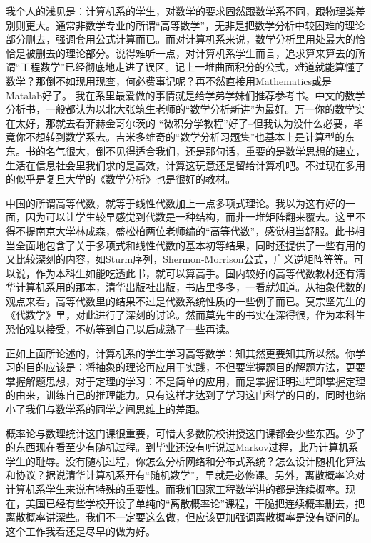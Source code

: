 我个人的浅见是：计算机系的学生，对数学的要求固然跟数学系不同，跟物理类差别则更大。通常非数学专业的所谓“高等数学”，无非是把数学分析中较困难的理论部分删去，强调套用公式计算而已。而对计算机系来说，数学分析里用处最大的恰恰是被删去的理论部分。说得难听一点，对计算机系学生而言，追求算来算去的所谓“工程数学”已经彻底地走进了误区。记上一堆曲面积分的公式，难道就能算懂了数学？那倒不如现用现查，何必费事记呢？再不然直接用Mathematics或是Matalab好了。
我在系里最爱做的事情就是给学弟学妹们推荐参考书。中文的数学分析书，一般都认为以北大张筑生老师的“数学分析新讲”为最好。万一你的数学实在太好，那就去看菲赫金哥尔茨的 “微积分学教程”好了--但我认为没什么必要，毕竟你不想转到数学系去。吉米多维奇的“数学分析习题集”也基本上是计算型的东东。书的名气很大，倒不见得适合我们，还是那句话，重要的是数学思想的建立，生活在信息社会里我们求的是高效，计算这玩意还是留给计算机吧。不过现在多用的似乎是复旦大学的《数学分析》也是很好的教材。

中国的所谓高等代数，就等于线性代数加上一点多项式理论。我以为这有好的一面，因为可以让学生较早感觉到代数是一种结构，而非一堆矩阵翻来覆去。这里不得不提南京大学林成森，盛松柏两位老师编的“高等代数”，感觉相当舒服。此书相当全面地包含了关于多项式和线性代数的基本初等结果，同时还提供了一些有用的又比较深刻的内容，如Sturm序列，Shermon-Morrison公式，广义逆矩阵等等。可以说，作为本科生如能吃透此书，就可以算高手。国内较好的高等代数教材还有清华计算机系用的那本，清华出版社出版，书店里多多，一看就知道。从抽象代数的观点来看，高等代数里的结果不过是代数系统性质的一些例子而已。莫宗坚先生的《代数学》里，对此进行了深刻的讨论。然而莫先生的书实在深得很，作为本科生恐怕难以接受，不妨等到自己以后成熟了一些再读。

正如上面所论述的，计算机系的学生学习高等数学：知其然更要知其所以然。你学习的目的应该是：将抽象的理论再应用于实践，不但要掌握题目的解题方法，更要掌握解题思想，对于定理的学习：不是简单的应用，而是掌握证明过程即掌握定理的由来，训练自己的推理能力。只有这样才达到了学习这门科学的目的，同时也缩小了我们与数学系的同学之间思维上的差距。

概率论与数理统计这门课很重要，可惜大多数院校讲授这门课都会少些东西。少了的东西现在看至少有随机过程。到毕业还没有听说过Markov过程，此乃计算机系学生的耻辱。没有随机过程，你怎么分析网络和分布式系统？怎么设计随机化算法和协议？据说清华计算机系开有“随机数学”，早就是必修课。另外，离散概率论对计算机系学生来说有特殊的重要性。而我们国家工程数学讲的都是连续概率。现在，美国已经有些学校开设了单纯的“离散概率论”课程，干脆把连续概率删去，把离散概率讲深些。我们不一定要这么做，但应该更加强调离散概率是没有疑问的。这个工作我看还是尽早的做为好。

